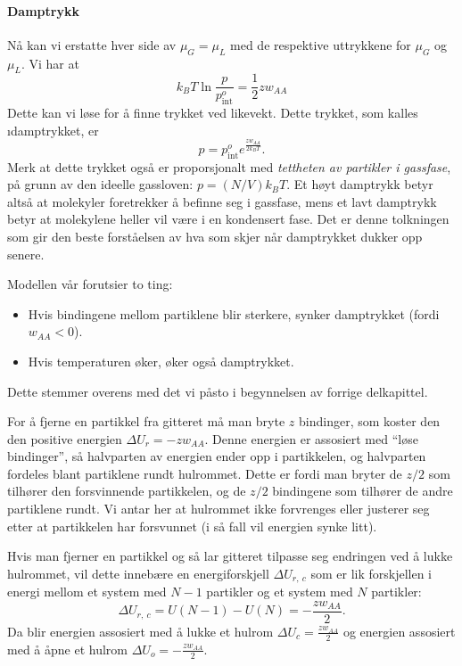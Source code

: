 \paragraph{Damptrykk} Nå kan vi erstatte hver side av $\mu_G=\mu_L$ med de respektive uttrykkene for $\mu_G$ og $\mu_L$. Vi har at
\begin{equation}
	k_BT\ln\frac{p}{p_{\text{int}}^o}=\frac{1}{2}zw_{AA}
\end{equation}
Dette kan vi løse for å finne trykket ved likevekt. Dette trykket, som kalles \i{damptrykket}, er
\begin{equation}
	\label{vaporpressure}
	p=p_{\text{int}}^oe^{\frac{zw_{AA}}{2k_BT}}.
\end{equation}
Merk at dette trykket også er proporsjonalt med \emph{tettheten av partikler i gassfase}, på grunn av den ideelle gassloven: $p = (N/V)k_BT$. Et høyt damptrykk betyr altså at molekyler foretrekker å befinne seg i gassfase, mens et lavt damptrykk betyr at molekylene heller vil være i en kondensert fase. Det er denne tolkningen som gir den beste forståelsen av hva som skjer når damptrykket dukker opp senere.

Modellen vår forutsier to ting:
\begin{itemize}
	\item Hvis bindingene mellom partiklene blir sterkere, synker damptrykket (fordi $w_{AA} < 0$).
	\item Hvis temperaturen øker, øker også damptrykket.
\end{itemize}
Dette stemmer overens med det vi påsto i begynnelsen av forrige delkapittel.

For å fjerne en partikkel fra gitteret må man bryte $z$ bindinger, som koster den den positive energien $\Delta U_r=-zw_{AA}$. Denne energien er assosiert med ``løse bindinger'', så halvparten av energien ender opp i partikkelen, og halvparten fordeles blant partiklene rundt hulrommet. Dette er fordi man bryter de $z/2$ som tilhører den forsvinnende partikkelen, og de $z/2$ bindingene som tilhører de andre partiklene rundt. Vi antar her at hulrommet ikke forvrenges eller justerer seg etter at partikkelen har forsvunnet (i så fall vil energien synke litt).

Hvis man fjerner en partikkel og så lar gitteret tilpasse seg endringen ved å lukke hulrommet, vil dette innebære en energiforskjell $\Delta U_{r,\ c}$ som er lik forskjellen i energi mellom et system med $N-1$ partikler og et system med $N$ partikler: 
\begin{equation}
\Delta U_{r,\ c}=U(N-1)-U(N)=-\frac{zw_{AA}}{2}.
\end{equation}
Da blir energien assosiert med å lukke et hulrom $\Delta U_c = \frac{zw_{AA}}{2}$ og energien assosiert med å åpne et hulrom $\Delta U_o=-\frac{zw_{AA}}{2}$.

